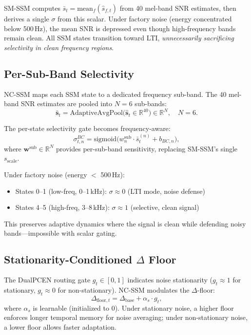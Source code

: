 \documentclass[journal]{IEEEtran}
\begin{document}
SM-SSM computes $\bar{s}_t = \text{mean}_f(\hat{s}_{f,t})$ from 40 mel-band SNR estimates, then derives a single $\sigma$ from this scalar.
Under factory noise (energy concentrated below 500\,Hz), the mean SNR is depressed even though high-frequency bands remain clean.
All SSM states transition toward LTI, \emph{unnecessarily sacrificing selectivity in clean frequency regions}.

\subsection{Per-Sub-Band Selectivity}
\label{sec:subband}

NC-SSM maps each SSM state to a dedicated frequency sub-band.
The 40 mel-band SNR estimates are pooled into $N = 6$ sub-bands:
\begin{equation}
\bar{\mathbf{s}}_t = \text{AdaptiveAvgPool}\big(\hat{\mathbf{s}}_t \in \mathbb{R}^{40}\big) \in \mathbb{R}^N, \quad N{=}6.
\label{eq:subband_snr}
\end{equation}

The per-state selectivity gate becomes frequency-aware:
\begin{equation}
\sigma^{BC}_{t,n} = \text{sigmoid}\!\big(w^{\text{sub}}_n \cdot \bar{s}^{(n)}_t + b_{BC,n}\big),
\label{eq:nc_sigma}
\end{equation}
where $\mathbf{w}^{\text{sub}} \in \mathbb{R}^N$ provides per-sub-band sensitivity, replacing SM-SSM's single $s_{\text{scale}}$.

Under factory noise (energy $<$ 500\,Hz):
\begin{itemize}
\setlength\itemsep{0pt}
\item States 0--1 (low-freq, 0--1\,kHz): $\sigma \approx 0$ (LTI mode, noise defense)
\item States 4--5 (high-freq, 3--8\,kHz): $\sigma \approx 1$ (selective, clean signal)
\end{itemize}
This preserves adaptive dynamics where the signal is clean while defending noisy bands---impossible with scalar gating.

\subsection{Stationarity-Conditioned $\Delta$ Floor}

The DualPCEN routing gate $g_t \in [0,1]$ indicates noise stationarity ($g_t \approx 1$ for stationary, $g_t \approx 0$ for non-stationary).
NC-SSM modulates the $\Delta$-floor:
\begin{equation}
\Delta_{\text{floor},t} = \Delta_{\text{base}} + \alpha_s \cdot g_t,
\label{eq:station_dt}
\end{equation}
where $\alpha_s$ is learnable (initialized to 0).
Under stationary noise, a higher floor enforces longer temporal memory for noise averaging; under non-stationary noise, a lower floor allows faster adaptation.
\end{document}
